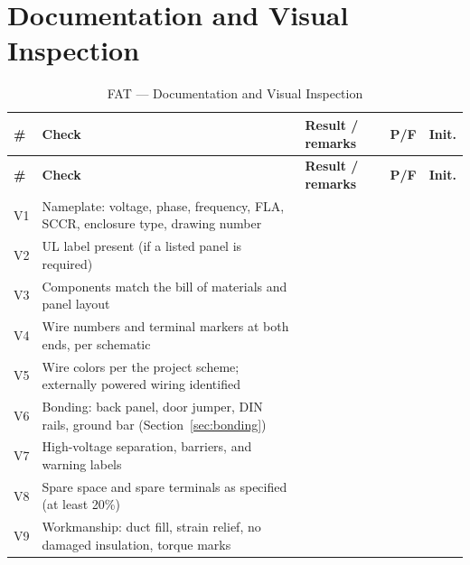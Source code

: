 \section{Documentation and Visual Inspection}
\begin{small}
\begin{longtable}{@{}|P{0.76cm}|P{6.51cm}|P{4.76cm}|P{1.31cm}|P{2.23cm}|@{}}
\caption{FAT --- Documentation and Visual Inspection}\label{tab:fat-visual} \\
\hline
{}\textbf{\#} & \textbf{Check} & \textbf{Result / remarks} & \textbf{P/F} & \textbf{Init.} \\ \hline
\endfirsthead
\hline
{}\textbf{\#} & \textbf{Check} & \textbf{Result / remarks} & \textbf{P/F} & \textbf{Init.} \\ \hline
\endhead
V1 & Nameplate: voltage, phase, frequency, FLA, SCCR, enclosure type, drawing number & & & \\ \hline
V2 & UL label present (if a listed panel is required) & & & \\ \hline
V3 & Components match the bill of materials and panel layout & & & \\ \hline
V4 & Wire numbers and terminal markers at both ends, per schematic & & & \\ \hline
V5 & Wire colors per the project scheme; externally powered wiring identified & & & \\ \hline
V6 & Bonding: back panel, door jumper, DIN rails, ground bar (Section~\ref{sec:bonding}) & & & \\ \hline
V7 & High-voltage separation, barriers, and warning labels & & & \\ \hline
V8 & Spare space and spare terminals as specified (at least 20\%) & & & \\ \hline
V9 & Workmanship: duct fill, strain relief, no damaged insulation, torque marks & & & \\ \hline
\end{longtable}
\end{small}

